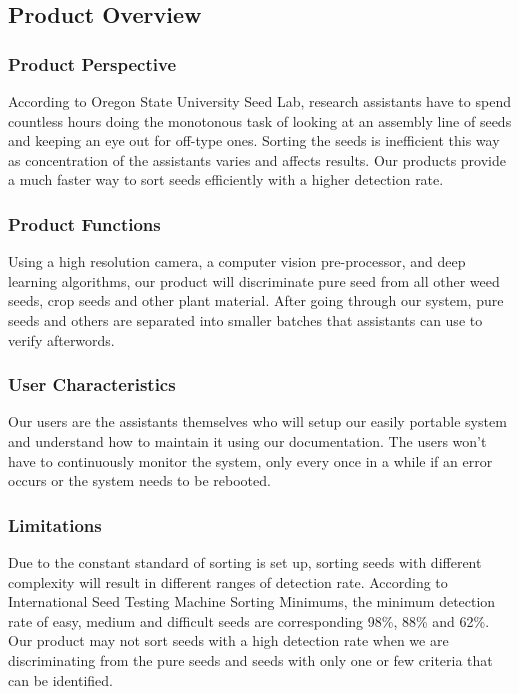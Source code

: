 \documentclass[onecolumn, draftclsnofoot,10pt, compsoc]{IEEEtran}
\begin{document}
\subsection{Product Overview}

\subsubsection{Product Perspective}
According to Oregon State University Seed Lab, research assistants have to spend countless hours doing the monotonous task of looking at an assembly line of seeds and keeping an eye out for off-type ones. Sorting the seeds is inefficient this way as concentration of the assistants varies and affects results. Our products provide a much faster way to sort seeds efficiently with a higher detection rate.

\subsubsection{Product Functions}
Using a high resolution camera, a computer vision pre-processor, and deep learning algorithms, our product will discriminate pure seed from all other weed seeds, crop seeds and other plant material. After going through our system, pure seeds and others are separated into smaller batches that assistants can use to verify afterwords. 

\subsubsection{User Characteristics}
Our users are the assistants themselves who will setup our easily portable system and understand how to maintain it using our documentation. The users won't have to continuously monitor the system, only every once in a while if an error occurs or the system needs to be rebooted.

\subsubsection{Limitations}
Due to the constant standard of sorting is set up, sorting seeds with different complexity will result in different ranges of detection rate. According to International Seed Testing Machine Sorting Minimums, the minimum detection rate of easy, medium and difficult seeds are corresponding 98\%, 88\% and 62\%. Our product may not sort seeds with a high detection rate when we are discriminating from the pure seeds and seeds with only one or few criteria that can be identified.
\end{document}
